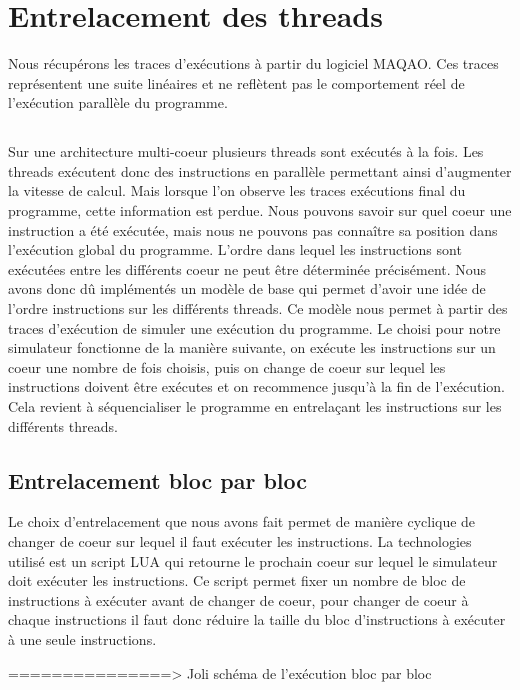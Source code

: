  \section{Entrelacement des threads}

Nous récupérons les traces d'exécutions à partir du logiciel MAQAO. Ces traces représentent une suite linéaires et ne reflètent pas le comportement réel de l'exécution parallèle du programme. 


\subsection{}
Sur une architecture multi-coeur plusieurs threads sont exécutés à la fois. Les threads exécutent donc des instructions en parallèle permettant ainsi d'augmenter la vitesse de calcul. Mais lorsque l'on observe les traces exécutions final du programme, cette information est perdue. Nous pouvons savoir sur quel coeur une instruction a été exécutée, mais nous ne pouvons pas connaître sa position dans l'exécution global du programme. L'ordre dans lequel les instructions sont exécutées entre les différents coeur ne peut être déterminée précisément. Nous avons donc dû implémentés un modèle de base qui permet d'avoir une idée de l'ordre instructions sur les différents threads. Ce modèle nous permet à partir des traces d'exécution de simuler une exécution du programme. Le choisi pour notre simulateur fonctionne de la manière suivante, on exécute les instructions sur un coeur une nombre de fois choisis, puis on change de coeur sur lequel les instructions doivent être exécutes et on recommence jusqu'à la fin de l'exécution. Cela revient à séquencialiser le programme en entrelaçant les instructions sur les différents threads.

\subsection{Entrelacement bloc par bloc}
Le choix d'entrelacement que nous avons fait permet de manière cyclique de changer de coeur sur lequel il faut exécuter les instructions. La technologies utilisé est un script LUA qui retourne le prochain coeur sur lequel le simulateur doit exécuter les instructions. Ce script permet fixer un nombre de bloc de instructions à exécuter avant de changer de coeur, pour changer de coeur à chaque instructions il faut donc réduire la taille du bloc d'instructions à exécuter à une seule instructions.

===============> Joli schéma de l'exécution bloc par bloc



